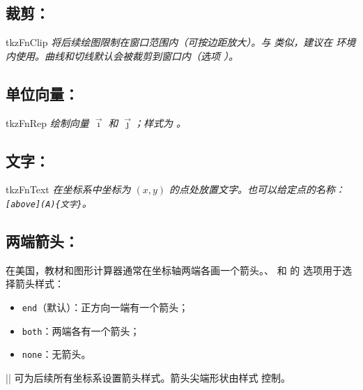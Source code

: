 \subsection{裁剪：}

\begin{NewMacroBox}{tkzFnClip}{}
\emph{将后续绘图限制在窗口范围内（可按边距放大）。与  类似，建议在  环境内使用。曲线和切线默认会被裁剪到窗口内（选项 ）。}
\end{NewMacroBox}

\subsection{单位向量：}

\begin{NewMacroBox}{tkzFnRep}{}
\emph{绘制向量 $\vec{\imath}$ 和 $\vec{\jmath}$；样式为 。}
\end{NewMacroBox}

\subsection{文字：}

\begin{NewMacroBox}{tkzFnText}{}
\emph{在坐标系中坐标为 $(x, y)$ 的点处放置文字。也可以给定点的名称：\texttt{[above](A)\{文字\}}。}
\end{NewMacroBox}

\begin{tkzexample}[latex=8cm]
\end{tkzexample}

\subsection{两端箭头：}\label{sec:arrows}

在美国，教材和图形计算器通常在坐标轴两端各画一个箭头。、 和  的  选项用于选择箭头样式：
\begin{itemize}
  \item \texttt{end}（默认）：正方向一端有一个箭头；
  \item \texttt{both}：两端各有一个箭头；
  \item \texttt{none}：无箭头。
\end{itemize}
|| 可为后续所有坐标系设置箭头样式。箭头尖端形状由样式  控制。

